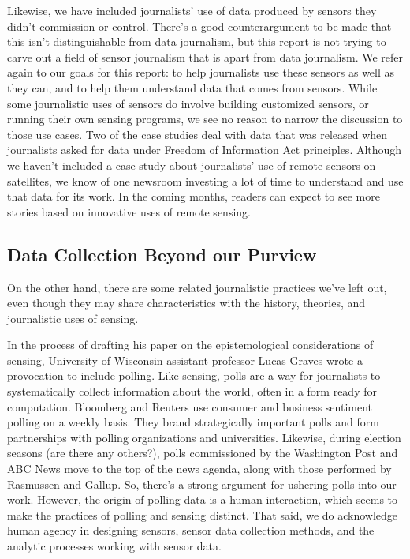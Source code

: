 Likewise, we have included journalists' use of data produced by sensors
they didn't commission or control. There's a good counterargument to be
made that this isn't distinguishable from data journalism, but this report
is not trying to carve out a field of sensor journalism that is apart from
data journalism. We refer again to our goals for this report: to help journalists
use these sensors as well as they can, and to help them understand
data that comes from sensors. While some journalistic uses of sensors do
involve building customized sensors, or running their own sensing programs,
we see no reason to narrow the discussion to those use cases. Two
of the case studies deal with data that was released when journalists asked
for data under Freedom of Information Act principles. Although we haven't
included a case study about journalists' use of remote sensors on satellites,
we know of one newsroom investing a lot of time to understand and use
that data for its work. In the coming months, readers can expect to see more
stories based on innovative uses of remote sensing.

\subsection{Data Collection Beyond our Purview}
On the other hand, there are some related journalistic practices we've left
out, even though they may share characteristics with the history, theories,
and journalistic uses of sensing.

In the process of drafting his paper on the epistemological considerations
of sensing, University of Wisconsin assistant professor Lucas Graves wrote
a provocation to include polling. Like sensing, polls are a way for journalists
to systematically collect information about the world, often in a form ready
for computation. Bloomberg and Reuters use consumer and business sentiment
polling on a weekly basis. They brand strategically important polls and
form partnerships with polling organizations and universities. Likewise,
during election seasons (are there any others?), polls commissioned by the
Washington Post and ABC News move to the top of the news agenda, along
with those performed by Rasmussen and Gallup. So, there's a strong argument
for ushering polls into our work. However, the origin of polling data is a human interaction, which seems to make the practices of polling and
sensing distinct. That said, we do acknowledge human agency in designing
sensors, sensor data collection methods, and the analytic processes working
with sensor data.

